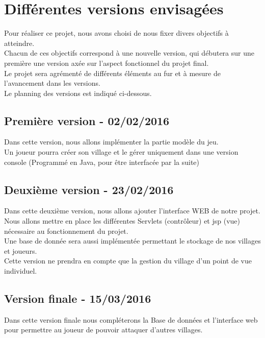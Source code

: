 \chapter{Différentes versions envisagées}

    Pour réaliser ce projet, nous avons choisi de nous fixer divers objectifs à atteindre.\\
    Chacun de ces objectifs correspond à une nouvelle version, qui débutera sur une première une version axée sur l'aspect fonctionnel du projet final.\\
    Le projet sera agrémenté de différents éléments au fur et à mesure de l'avancement dans les versions.\\

    Le planning des versions est indiqué ci-dessous.

    \section{Première version - 02/02/2016}
        Dans cette version, nous allons implémenter la partie modèle du jeu.\\
        Un joueur pourra créer son village et le gérer uniquement dans une version console (Programmé en Java, pour être interfacée par la suite)

    \section{Deuxième version - 23/02/2016}
        Dans cette deuxième version, nous allons ajouter l'interface WEB de notre projet.\\
        Nous allons mettre en place les différentes Servlets (contrôleur) et jsp (vue) nécessaire au fonctionnement du projet.\\
        Une base de donnée sera aussi implémentée permettant le stockage de nos villages et joueurs.\\
        Cette version ne prendra en compte que la gestion du village d'un point de vue individuel.

    \section{Version finale - 15/03/2016}
        Dans cette version finale nous compléterons la Base de données et l'interface web pour permettre au joueur de pouvoir attaquer d'autres villages.
